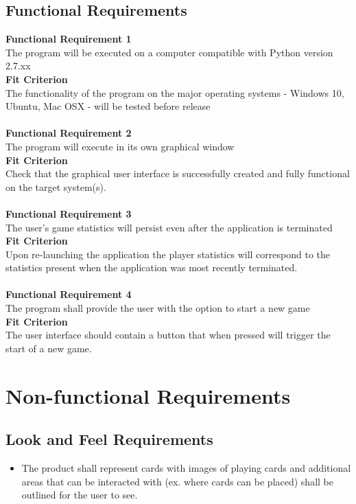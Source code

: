 \documentclass{article}
\newcommand {\PYVER}{2.7.xx }
\begin{document}
		\subsection{Functional Requirements}
		\indent \indent \textbf {Functional Requirement 1} \label{freq1}\\
		\indent \indent The program will be executed on a computer compatible with
		Python version \PYVER\\
		\indent \textbf {Fit Criterion}\\
		\indent \indent The functionality of the program on the major operating
		systems - Windows 10, Ubuntu, Mac OSX - will be tested before release\\\\
		\indent \textbf {Functional Requirement 2} \label{freq2}\\
		\indent \indent The program will execute in its own graphical window\\
		\indent \textbf {Fit Criterion}\\
		\indent \indent Check that the graphical user interface is successfully
		created and fully functional on the target system(s).\\\\
		\indent \textbf {Functional Requirement 3} \label{freq3}\\
		\indent \indent The user’s game statistics will persist even after the 
		application is	terminated\\
		\indent \textbf {Fit Criterion}\\
		\indent \indent Upon re-launching the application the player statistics will
		correspond to the statistics present when the application was most recently
		terminated.\\\\
		\indent \textbf {Functional Requirement 4} \label{freq4}\\
		\indent \indent The program shall provide the user with the option to start a 
		new game\\
		\indent \textbf {Fit Criterion}\\
		\indent \indent The user interface should contain a button that when pressed 
		will trigger the start of a new game.
	
	\section{Non-functional Requirements}
		\subsection{Look and Feel Requirements}
		\begin{itemize}
			\itemsep0em
			\item The product shall represent cards with images of playing 
			cards and additional areas that can be interacted with (ex. where 
			cards can be placed) shall be outlined for the user to see.
		\end{itemize}
\end{document}
